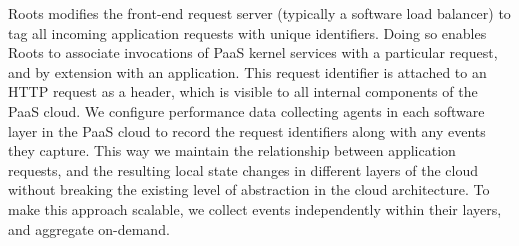 

Roots modifies the front-end request server (typically a software load balancer) 
to tag all incoming application requests with unique identifiers. Doing so enables Roots
to associate invocations of PaaS kernel services with a particular request, and by extension with an application.
This request identifier is attached to an HTTP request as a header, which is visible to all 
internal components of the PaaS cloud. We configure performance data collecting
agents in each software layer in the PaaS 
cloud to record the request identifiers along with any events they capture. 
This way we maintain the relationship between application requests, and the resulting
local state changes in different layers of the cloud without breaking the existing level
of abstraction in the cloud architecture. 
To make this approach scalable, we collect events independently within their layers, and 
aggregate on-demand.

